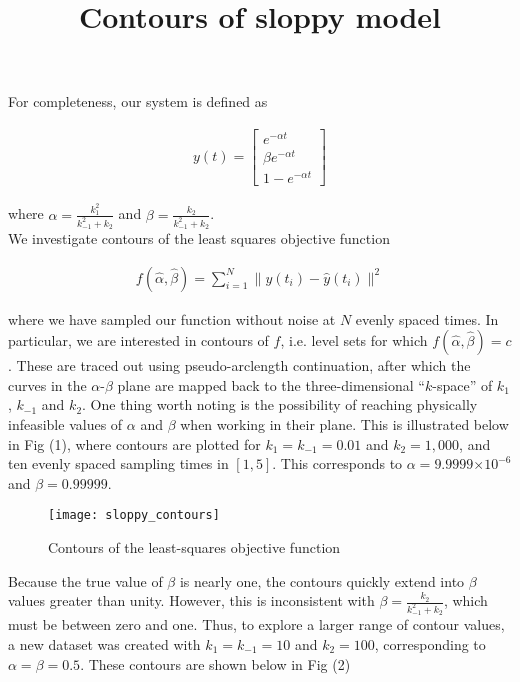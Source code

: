 \documentclass[12pt]{article}
\providecommand{\e}[1]{\ensuremath{\times 10^{#1}}}
\begin{document}
\title{Contours of sloppy model}
\maketitle

For completeness, our system is defined as

\begin{align*}
  y(t) = \begin{bmatrix} e^{-\alpha t} \\ \beta e^{-\alpha t} \\ 1 - e^{-\alpha t} \end{bmatrix}
\end{align*}

where $\alpha = \frac{k_1^2}{k_{-1}^2 + k_2}$ and $\beta = \frac{k_2}{k_{-1}^2 + k_2}$. \\

We investigate contours of the least squares objective function

\begin{align*}
  f(\hat{\alpha}, \hat{\beta}) = \sum \limits_{i=1}^N \| y(t_i) - \hat{y}(t_i) \|^2
\end{align*}

where we have sampled our function without noise at $N$ evenly spaced times. In particular, we are interested in contours of $f$, i.e. level sets for which $f(\hat{\alpha}, \hat{\beta}) = c$. These are traced out using pseudo-arclength continuation, after which the curves in the $\alpha$-$\beta$ plane are mapped back to the three-dimensional ``$k$-space'' of $k_1$, $k_{-1}$ and $k_2$. One thing worth noting is the possibility of reaching physically infeasible values of $\alpha$ and $\beta$ when working in their plane. This is illustrated below in Fig (1), where contours are plotted for $k_1 = k_{-1} = 0.01$ and $k_2 = 1,000$, and ten evenly spaced sampling times in $[1,5]$. This corresponds to $\alpha = 9.9999\e{-6}$ and $\beta = 0.99999$. \\

\begin{figure}[H]
  \texttt{[image: sloppy\_contours]}
  \caption{Contours of the least-squares objective function}
\end{figure}

Because the true value of $\beta$ is nearly one, the contours quickly extend into $\beta$ values greater than unity. However, this is inconsistent with $\beta = \frac{k_2}{k_{-1}^2 + k_2}$, which must be between zero and one. Thus, to explore a larger range of contour values, a new dataset was created with $k_1 = k_{-1} = 10$ and $k_2 = 100$, corresponding to $\alpha =  \beta = 0.5$. These contours are shown below in Fig (2) \\
\end{document}
